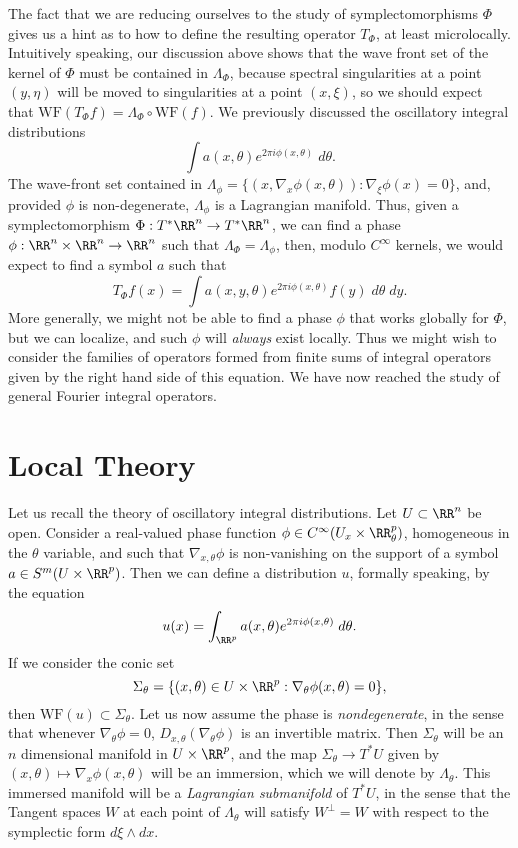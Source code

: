 The fact that we are reducing ourselves to the study of symplectomorphisms $\Phi$ gives us a hint as to how to define the resulting operator $T_\Phi$, at least microlocally. Intuitively speaking, our discussion above shows that the wave front set of the kernel of $\Phi$ must be contained in $\Lambda_\Phi$, because spectral singularities at a point $(y,\eta)$ will be moved to singularities at a point $(x,\xi)$, so we should expect that $\text{WF}(T_\Phi f) = \Lambda_\Phi \circ \text{WF}(f)$. We previously discussed the oscillatory integral distributions
%
\[ \int a(x,\theta) e^{2 \pi i \phi(x,\theta)}\; d\theta. \]
%
The wave-front set contained in $\Lambda_\phi = \{ (x,\nabla_x \phi(x,\theta)) : \nabla_\xi \phi(x) = 0 \}$, and, provided $\phi$ is non-degenerate, $\Lambda_\phi$ is a Lagrangian manifold. Thus, given a symplectomorphism $\Phi: T^* \RR^n \to T^* \RR^n$, we can find a phase $\phi: \RR^n \times \RR^n \to \RR^n$ such that $\Lambda_\Phi = \Lambda_\phi$, then, modulo $C^\infty$ kernels, we would expect to find a symbol $a$ such that
%
\[ T_\Phi f(x) = \int a(x,y,\theta) e^{2 \pi i \phi(x,\theta)} f(y)\; d\theta\; dy. \]
%
More generally, we might not be able to find a phase $\phi$ that works globally for $\Phi$, but we can localize, and such $\phi$ will \emph{always} exist locally. Thus we might wish to consider the families of operators formed from finite sums of integral operators given by the right hand side of this equation. We have now reached the study of general Fourier integral operators.

\section{Local Theory}

Let us recall the theory of oscillatory integral distributions. Let $U \subset \RR^n$ be open. Consider a real-valued phase function $\phi \in C^\infty(U_x \times \RR^p_\theta)$, homogeneous in the $\theta$ variable, and such that $\nabla_{x,\theta} \phi$ is non-vanishing on the support of a symbol $a \in S^m(U \times \RR^p)$. Then we can define a distribution $u$, formally speaking, by the equation
%
\[ u(x) = \int_{\RR^p} a(x,\theta) e^{2 \pi i \phi(x,\theta)}\; d\theta. \]
%
If we consider the conic set
%
\[ \Sigma_\theta = \{ (x,\theta) \in U \times \RR^p : \nabla_\theta \phi(x,\theta) = 0 \}, \]
%
then $\text{WF}(u) \subset \Sigma_\theta$. Let us now assume the phase is \emph{nondegenerate}, in the sense that whenever $\nabla_\theta \phi = 0$, $D_{x,\theta} (\nabla_\theta \phi)$ is an invertible matrix. Then $\Sigma_\theta$ will be an $n$ dimensional manifold in $U \times \RR^p$, and the map $\Sigma_\theta \to T^* U$ given by $(x,\theta) \mapsto \nabla_x \phi(x,\theta)$ will be an immersion, which we will denote by $\Lambda_\theta$. This immersed manifold will be a \emph{Lagrangian submanifold} of $T^* U$, in the sense that the Tangent spaces $W$ at each point of $\Lambda_\theta$ will satisfy $W^\perp = W$ with respect to the symplectic form $d\xi \wedge dx$.

